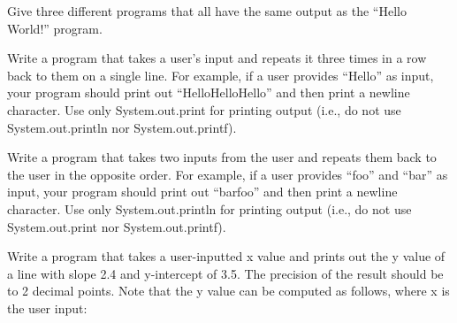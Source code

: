 \exercisesection

\begin{exercise}
Give three different programs that all have the same output as the “Hello World!” program.
\end{exercise}

\begin{exercise}
Write a program that takes a user’s input and repeats it three times in a row back to them on a single line. For example, if a user provides “Hello” as input, your program should print out “HelloHelloHello” and then print a newline character. Use only System.out.print for printing output (i.e., do not use System.out.println nor System.out.printf).
\end{exercise}

\begin{exercise}
Write a program that takes two inputs from the user and repeats them back to the user in the opposite order. For example, if a user provides “foo” and “bar” as input, your program should print out “barfoo” and then print a newline character. Use only System.out.println for printing output (i.e., do not use System.out.print nor System.out.printf).
\end{exercise}

\begin{exercise}
Write a program that takes a user-inputted x value and prints out the y value of a line with slope 2.4 and y-intercept of 3.5. The precision of the result should be to 2 decimal points. Note that the y value can be computed as follows, where x is the user input: 
\end{exercise}
